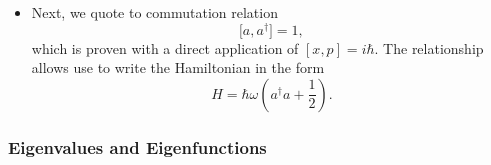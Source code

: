 \documentclass[11pt, a4paper]{article}
\begin{document}
\begin{itemize}
	\item Next, we quote to commutation relation
	\begin{equation*}
		\big[a, a^{\dagger}\big] = 1,
	\end{equation*}
	which is proven with a direct application of $ [x, p] = i \hbar $. The relationship allows use to write the Hamiltonian in the form
	\begin{equation*}
		H = \hbar \omega \left(a^{\dagger}a + \frac{1}{2}\right).
	\end{equation*}
	
\end{itemize}

\subsubsection{Eigenvalues and Eigenfunctions}
\end{document}
